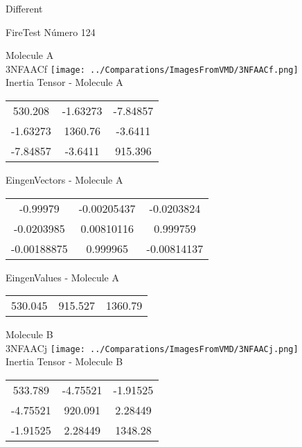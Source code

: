 \begin{center}
\vtab
\vtab
\textcolor{NavyBlue}{\Large Different}
\end{center}

 \newpage

\vtab[-2cm]
\begin{center}
{\large FireTest \tab Número 124}
\end{center}
\begin{multicols}{2}
\begin{center}

Molecule A \\ 
3NFAACf
\texttt{[image: ../Comparations/ImagesFromVMD/3NFAACf.png]}
\\
Inertia Tensor - Molecule A \\
\vtab

\begin{tabular}{|c c c|}
530.208	 & 	-1.63273	 & 	-7.84857	 \\
-1.63273	 & 	1360.76	 & 	-3.6411	 \\
-7.84857	 & 	-3.6411	 & 	915.396
\end{tabular}

\vtab
 EingenVectors - Molecule A     \\
\vtab
\begin{tabular}{|c c c|}
-0.99979	 & 	-0.00205437	 & 	-0.0203824	 \\
-0.0203985	 & 	0.00810116	 & 	0.999759	 \\
-0.00188875	 & 	0.999965	 & 	-0.00814137
\end{tabular}

\vtab
 EingenValues - Molecule A     \\
\vtab
\begin{tabular}{|c c c|}
530.045	 & 	915.527	 & 	1360.79	 \\
\end{tabular}
\columnbreak

Molecule B \\ 
3NFAACj
\texttt{[image: ../Comparations/ImagesFromVMD/3NFAACj.png]}
\\
Inertia Tensor - Molecule B \\
\vtab

\begin{tabular}{|c c c|}
533.789	 & 	-4.75521	 & 	-1.91525	 \\
-4.75521	 & 	920.091	 & 	2.28449	 \\
-1.91525	 & 	2.28449	 & 	1348.28
\end{tabular}


\end{center}
\end{multicols}
